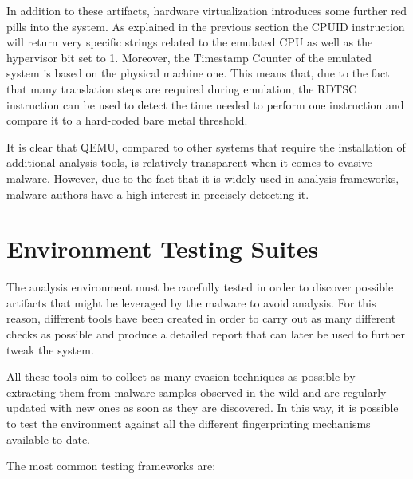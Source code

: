 In addition to these artifacts, hardware virtualization introduces some further red pills into the system. As explained in the previous section the CPUID instruction will return very specific strings related to the emulated CPU as well as the hypervisor bit set to 1. Moreover, the Timestamp Counter of the emulated system is based on the physical machine one. This means that, due to the fact that many translation steps are required during emulation, the RDTSC instruction can be used to detect the time needed to perform one instruction and compare it to a hard-coded bare metal threshold. 

It is clear that QEMU, compared to other systems that require the installation of additional analysis tools, is relatively transparent when it comes to evasive malware. However, due to the fact that it is widely used in analysis frameworks, malware authors have a high interest in precisely detecting it. 

\section{Environment Testing Suites}


The analysis environment must be carefully tested in order to discover possible artifacts that might be leveraged by the malware to avoid analysis. For this reason, different tools have been created in order to carry out as many different checks as possible and produce a detailed report that can later be used to further tweak the system.

All these tools aim to collect as many evasion techniques as possible by extracting them from malware samples observed in the wild and are regularly updated with new ones as soon as they are discovered. In this way, it is possible to test the environment against all the different fingerprinting mechanisms available to date. 

The most common testing frameworks are: 

